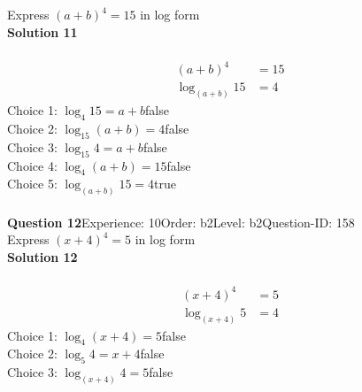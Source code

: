 \documentclass{article}
\begin{document}
Express $(a+b)^4=15$ in log form\\[4pt]
\noindent\textbf{Solution 11}\\[2pt]
\\[-35pt]\begin{align*}
(a+b)^4&=15\\[2pt]
\log_{(a+b)}15&=4
\end{align*}
Choice 1: \hspace{20pt}$\log_{4}15=a+b$\hspace{20pt}false\\
Choice 2: \hspace{20pt}$\log_{15}(a+b)=4$\hspace{20pt}false\\
Choice 3: \hspace{20pt}$\log_{15}4=a+b$\hspace{20pt}false\\
Choice 4: \hspace{20pt}$\log_{4}(a+b)=15$\hspace{20pt}false\\
Choice 5: \hspace{20pt}$\log_{(a+b)}15=4$\hspace{20pt}true\\
\\[4pt]
\noindent\textbf{Question 12}\hspace{20pt}Experience: 10\hspace{20pt}Order: b2\hspace{20pt}Level: b2\hspace{20pt}Question-ID: 158\\[2pt]
Express $(x+4)^4=5$ in log form\\[4pt]
\noindent\textbf{Solution 12}\\[2pt]
\\[-35pt]\begin{align*}
(x+4)^4&=5\\[2pt]
\log_{(x+4)}5&=4
\end{align*}
Choice 1: \hspace{20pt}$\log_{4}(x+4)=5$\hspace{20pt}false\\
Choice 2: \hspace{20pt}$\log_{5}4=x+4$\hspace{20pt}false\\
Choice 3: \hspace{20pt}$\log_{(x+4)}4=5$\hspace{20pt}false\\
\end{document}
